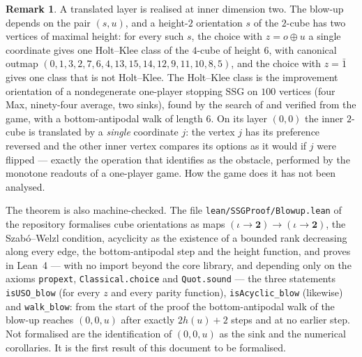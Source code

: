 \documentclass[11pt]{article}
\theoremstyle{plain}
\theoremstyle{definition}
\newtheorem{remark}[theorem]{Remark}
\begin{document}
\begin{remark}
A translated layer is realised at inner dimension two. The blow-up
depends on the pair $(s,u)$, and a height-$2$ orientation $s$ of the
$2$-cube has two vertices of maximal height: for every such $s$, the
choice with $z=o\oplus u$ a single coordinate gives one Holt--Klee class
of the $4$-cube of height $6$, with canonical outmap
$(0,1,3,2,7,6,4,13,15,14,12,9,11,10,8,5)$, and the choice with
$z=\bar1$ gives one class that is not Holt--Klee. The Holt--Klee class is
the improvement orientation of a nondegenerate one-player stopping SSG on
$100$ vertices (four Max, ninety-four average, two sinks), found by the
search of  and verified from the game, with a
bottom-antipodal walk of length $6$. On its layer $(0,0)$ the inner
$2$-cube is translated by a \emph{single} coordinate $j$: the vertex $j$
has its preference reversed and the other inner vertex compares its
options as it would if $j$ were flipped --- exactly the operation that
 identifies as the obstacle, performed by the
monotone readouts of a one-player game. How the game does it has not been
analysed.

The theorem is also machine-checked. The file \texttt{lean/SSGProof/Blowup.lean}
of the repository formalises cube orientations as maps
$(\iota\to\mathbf{2})\to(\iota\to\mathbf{2})$, the Szab\'o--Welzl condition,
acyclicity as the existence of a bounded rank decreasing along every edge,
the bottom-antipodal step and the height function, and proves in Lean~4
--- with no import beyond the core library, and depending only on the
axioms \texttt{propext}, \texttt{Classical.choice} and \texttt{Quot.sound}
--- the three statements \texttt{isUSO\_blow} (for every $z$ and every
parity function), \texttt{isAcyclic\_blow} (likewise) and
\texttt{walk\_blow}: from the start of the proof the bottom-antipodal walk
of the blow-up reaches $(0,0,u)$ after exactly $2h(u)+2$ steps and at no
earlier step. Not formalised are the identification of $(0,0,u)$ as the
sink and the numerical corollaries. It is the first result of this
document to be formalised.
\end{remark}
\end{document}
